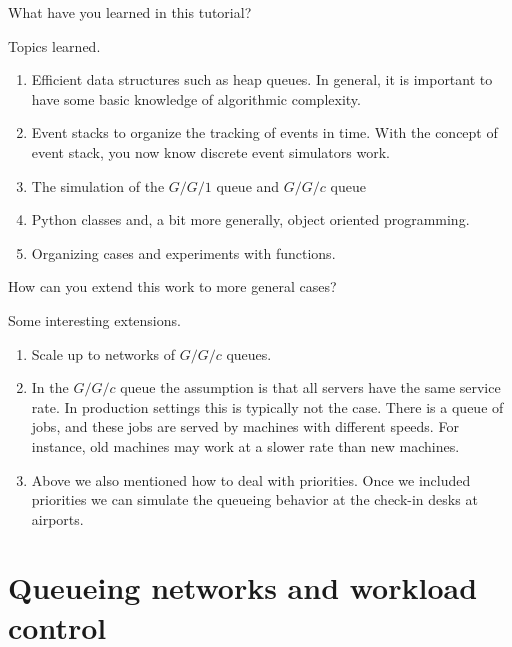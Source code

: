 \documentclass{scrartcl}
\begin{document}
\begin{exercise}
  What have you learned in this tutorial?
  \begin{solution}
    Topics learned.
    \begin{enumerate}
    \item Efficient data structures such as heap queues. In general, it is important to have some basic knowledge of algorithmic complexity. 
    \item Event stacks to organize the tracking of events in time. With the concept of event stack, you now know discrete event simulators work. 
    \item The simulation of the $G/G/1$ queue and $G/G/c$ queue
    \item Python classes and, a bit more generally, object oriented programming. 
    \item Organizing cases and experiments with functions.
    \end{enumerate}
  \end{solution}
\end{exercise}

\begin{exercise}
 How can you extend this work to more general cases? 
  \begin{solution}
Some  interesting extensions.
    \begin{enumerate}
    \item   Scale up to networks of $G/G/c$ queues.
    \item In the $G/G/c$ queue the assumption is that all servers have the same service rate. In production settings this is typically not the case. There is a queue of jobs, and these jobs are served by machines with different speeds. For instance, old machines may work at a slower rate than new machines. 
    \item Above we also mentioned how to deal with priorities. Once we included priorities we can simulate the queueing behavior at the check-in desks at airports. 
    \end{enumerate}
  \end{solution}
\end{exercise}

\clearpage

\section{Queueing networks and workload control}
\label{sec:queueing-network}
\end{document}
